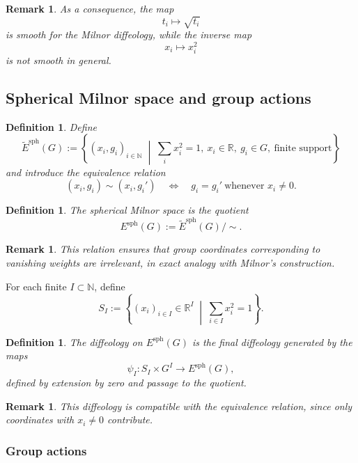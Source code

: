 \documentclass[11pt]{amsart}
\newtheorem{definition}[theorem]{Definition}
\newtheorem{remark}[theorem]{Remark}
\begin{document}
\begin{remark}
As a consequence, the map
\[
t_i \mapsto \sqrt{t_i}
\]
is smooth for the Milnor diffeology, while the inverse map
\[
x_i \mapsto x_i^2
\]
is not smooth in general.
\end{remark}

\subsection{Spherical Milnor space and group actions}

\begin{definition}
Define
\[
\widetilde E^{\mathrm{sph}}(G)
:=
\left\{
(x_i,g_i)_{i\in\mathbb{N}}
\;\middle|\;
\sum_i x_i^2 = 1,\ 
x_i \in \mathbb{R},\ 
g_i \in G,\ 
\text{finite support}
\right\}
\]
and introduce the equivalence relation
\[
(x_i,g_i)\sim (x_i,g_i')
\quad\Longleftrightarrow\quad
g_i=g_i' \ \text{whenever } x_i\neq 0.
\]
\end{definition}

\begin{definition}
The \emph{spherical Milnor space} is the quotient
\[
E^{\mathrm{sph}}(G) := \widetilde E^{\mathrm{sph}}(G)/\sim.
\]
\end{definition}

\begin{remark}
This relation ensures that group coordinates corresponding to vanishing weights are irrelevant, in exact analogy with Milnor's construction.
\end{remark}

\medskip

For each finite $I \subset \mathbb{N}$, define
\[
S_I := \left\{ (x_i)_{i\in I} \in \mathbb{R}^I \;\middle|\; \sum_{i\in I} x_i^2 = 1 \right\}.
\]

\begin{definition}
The diffeology on $E^{\mathrm{sph}}(G)$ is the final diffeology generated by the maps
\[
\psi_I : S_I \times G^I \to E^{\mathrm{sph}}(G),
\]
defined by extension by zero and passage to the quotient.
\end{definition}

\begin{remark}
This diffeology is compatible with the equivalence relation, since only coordinates with $x_i \neq 0$ contribute.
\end{remark}

\subsubsection{Group actions}
\end{document}
